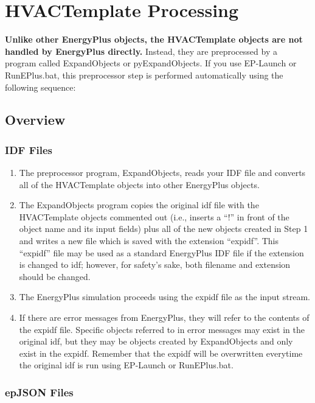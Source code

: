 \section{HVACTemplate Processing}\label{hvactemplate-processing}

\textbf{Unlike other EnergyPlus objects, the HVACTemplate objects are not handled by EnergyPlus directly.} Instead, they are preprocessed by a program called ExpandObjects or pyExpandObjects. If you use EP-Launch or RunEPlus.bat, this preprocessor step is performed automatically using the following sequence:

\subsection{Overview}

\subsubsection*{IDF Files}

\begin{enumerate}
\def\labelenumi{\arabic{enumi})}
\item
  The preprocessor program, ExpandObjects, reads your IDF file and converts all of the HVACTemplate objects into other EnergyPlus objects.
\item
  The ExpandObjects program copies the original idf file with the HVACTemplate objects commented out (i.e., inserts a ``!'' in front of the object name and its input fields) plus all of the new objects created in Step 1 and writes a new file which is saved with the extension ``expidf''. This ``expidf'' file may be used as a standard EnergyPlus IDF file if the extension is changed to idf; however, for safety's sake, both filename and extension should be changed.
\item
  The EnergyPlus simulation proceeds using the expidf file as the input stream.
\item
  If there are error messages from EnergyPlus, they will refer to the contents of the expidf file. Specific objects referred to in error messages may exist in the original idf, but they may be objects created by ExpandObjects and only exist in the expidf. Remember that the expidf will be overwritten everytime the original idf is run using EP-Launch or RunEPlus.bat.
\end{enumerate}

\subsubsection*{epJSON Files}

